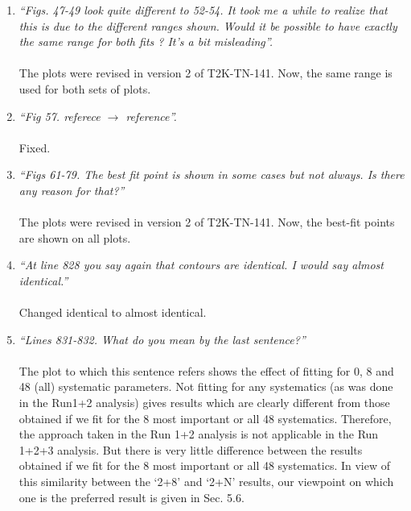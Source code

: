 \begin{enumerate}
\vspace{5 mm}
\item
{\em
  ``Figs. 47-49 look quite different to 52-54. It took me a while to realize that this is due to the 
    different ranges shown. Would it be possible to have exactly the same range for both fits ? 
    It's a bit misleading''.
}\\
\\
The plots were revised in version 2 of T2K-TN-141. Now, the same range is used for both sets of plots.

\vspace{5 mm}
\item
{\em
  ``Fig 57. referece $\rightarrow$ reference''.
}\\
\\
Fixed.

\vspace{5 mm}
\item
{\em
  ``Figs 61-79. The best fit point is shown in some cases but not always. Is there any reason for that?''
}\\
\\
The plots were revised in version 2 of T2K-TN-141. Now, the best-fit points are shown on all plots.

\vspace{5 mm}
\item
{\em
  ``At line 828 you say again that contours are identical. I would say almost identical.''
}\\
\\
Changed identical to almost identical.

\vspace{5 mm}
\item
{\em
  ``Lines 831-832. What do you mean by the last sentence?''
}\\
\\
The plot to which this sentence refers shows the effect of fitting for 0, 8 and 48 (all) systematic parameters.
Not fitting for any systematics (as was done in the Run1+2 analysis) gives results which are clearly
different from those obtained if we fit for the 8 most important or all 48 systematics.
Therefore, the approach  taken in the Run 1+2 analysis is not applicable in the Run 1+2+3 analysis.
But there is very little difference between the results obtained if we fit for
the 8 most important or all 48 systematics. In view of this similarity between the `2+8' and `2+N'
results, our viewpoint on which one is the preferred result is given in Sec. 5.6.


\end{enumerate}
